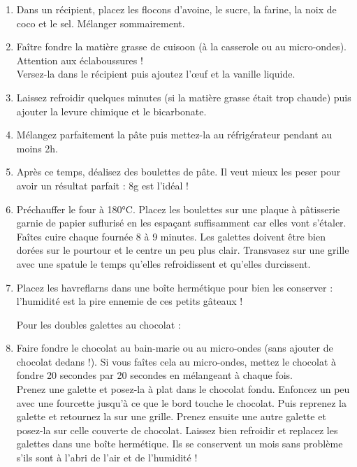{\begin{enumerate}
\item Dans un récipient, placez les flocons d'avoine, le sucre, la farine, la noix de coco et le sel. Mélanger sommairement.
\item Faître fondre la matière grasse de cuisoon (à la casserole ou au micro-ondes). Attention aux éclaboussures ! \\
Versez-la dans le récipient puis ajoutez l'\oe uf et la vanille liquide.
\item Laissez refroidir quelques minutes (si la matière grasse était trop chaude) puis ajouter la levure chimique et le bicarbonate.
\item Mélangez parfaitement la pâte puis mettez-la au réfrigérateur pendant au moins 2h.
\item Après ce temps, déalisez des boulettes de pâte. Il veut mieux les peser pour avoir un résultat parfait : 8g est l'idéal !
\item Préchauffer le four à 180°C. Placez les boulettes sur une plaque à pâtisserie garnie de papier suflurisé en les espaçant suffisamment car elles vont s'étaler. Faîtes cuire chaque fournée 8 à 9 minutes. Les galettes doivent être bien dorées sur le pourtour et le centre un peu plus clair. Transvasez sur une grille avec une spatule le temps qu'elles refroidissent et qu'elles durcissent.
\item Placez les havreflarns dans une boîte hermétique pour bien les conserver : l'humidité est la pire ennemie de ces petits gâteaux !

\bigskip
Pour les doubles galettes au chocolat :
\item Faire fondre le chocolat au bain-marie ou au micro-ondes (sans ajouter de chocolat dedans !). Si vous faîtes cela au micro-ondes, mettez le chocolat à fondre 20 secondes par 20 secondes en mélangeant à chaque fois.\\
Prenez une galette et posez-la à plat dans le chocolat fondu. Enfoncez un peu avec une fourcette jusqu'à ce que le bord touche le chocolat. Puis reprenez la galette et retournez la sur une grille. Prenez ensuite une autre galette et posez-la sur celle couverte de chocolat. Laissez bien refroidir et replacez les galettes dans une boîte hermétique. Ils se conservent un mois sans problème s'ils sont à l'abri de l'air et de l'humidité !
\end{enumerate}}

